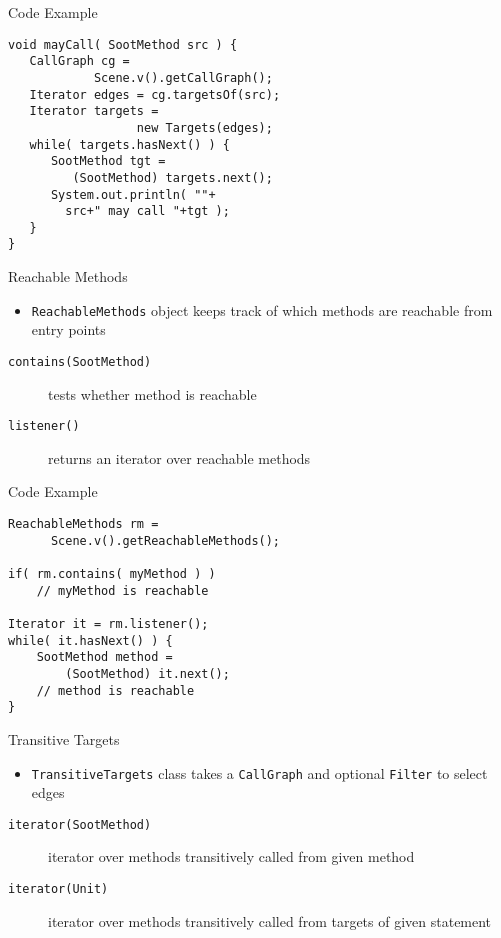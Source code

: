 \begin{slide}{Code Example}
\vspace*{-5mm}
\begin{verbatim}
void mayCall( SootMethod src ) {
   CallGraph cg =
            Scene.v().getCallGraph();
   Iterator edges = cg.targetsOf(src);
   Iterator targets =
                  new Targets(edges);
   while( targets.hasNext() ) {
      SootMethod tgt =
         (SootMethod) targets.next();
      System.out.println( ""+
        src+" may call "+tgt );
   }
}
\end{verbatim}
\end{slide}

\begin{slide}{Reachable Methods}
\begin{itemize}
\item \texttt{ReachableMethods} object keeps track of which methods are
reachable from entry points
\end{itemize}
\begin{description}
\item [\texttt{contains(SootMethod)}] tests whether method is reachable
\item [\texttt{listener()}] returns an iterator over reachable methods
\end{description}
\end{slide}

\begin{slide}{Code Example}
\begin{verbatim}
ReachableMethods rm =
      Scene.v().getReachableMethods();

if( rm.contains( myMethod ) ) 
    // myMethod is reachable

Iterator it = rm.listener();
while( it.hasNext() ) {
    SootMethod method = 
        (SootMethod) it.next();
    // method is reachable
}
\end{verbatim}
\end{slide}

\begin{slide}{Transitive Targets}
\begin{itemize}
\item {\tt TransitiveTargets} class takes a {\tt CallGraph} and
optional {\tt Filter} to select edges
\end{itemize}
\begin{description}
\item [\texttt{iterator(SootMethod)}] iterator over methods transitively
called from given method
\item [\texttt{iterator(Unit)}] iterator over methods transitively
called from targets of given statement
\end{description}
\end{slide}


